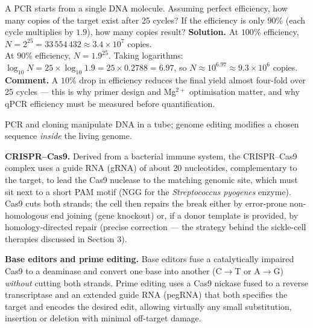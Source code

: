 \documentclass[11pt]{article}
\newcommand{\cle}[1]{{\popxbold\color{popdark}#1}}
\newcounter{popsec}
\newcounter{popsub}
\newcommand{\courssub}[1]{%
  \stepcounter{popsub}%
  \par\vspace{9pt}\noindent{\popxbold\fontsize{11.5}{13}\selectfont\color{popink}{\color{poporange}\thepopsec.\thepopsub}\hspace{6pt}#1}\par\nopagebreak\vspace{4pt}
}
\begin{document}
\begin{exoresolu}
A PCR starts from a single DNA molecule. Assuming perfect efficiency, how many copies of the target exist after 25 cycles? If the efficiency is only $90\%$ (each cycle multiplies by $1.9$), how many copies result?
\tcblower
\textbf{Solution.} At $100\%$ efficiency, $N = 2^{25} = 33\,554\,432 \approx 3.4\times 10^{7}$ copies.\\
At $90\%$ efficiency, $N = 1.9^{25}$. Taking logarithms: $\log_{10} N = 25 \times \log_{10} 1.9 = 25 \times 0.2788 = 6.97$, so $N \approx 10^{6.97} \approx 9.3 \times 10^{6}$ copies.\\
\textbf{Comment.} A $10\%$ drop in efficiency reduces the final yield almost four-fold over 25 cycles --- this is why primer design and Mg$^{2+}$ optimisation matter, and why qPCR efficiency must be measured before quantification.
\end{exoresolu}

\courssub{Modern genome-editing tools}

PCR and cloning manipulate DNA in a tube; \cle{genome editing} modifies a chosen sequence \emph{inside} the living genome.

\textbf{CRISPR--Cas9.} Derived from a bacterial immune system, the \cle{CRISPR--Cas9} complex uses a \cle{guide RNA (gRNA)} of about 20 nucleotides, complementary to the target, to lead the Cas9 nuclease to the matching genomic site, which must sit next to a short \cle{PAM} motif (NGG for the \emph{Streptococcus pyogenes} enzyme). Cas9 cuts both strands; the cell then repairs the break either by error-prone non-homologous end joining (gene knockout) or, if a donor template is provided, by homology-directed repair (precise correction --- the strategy behind the sickle-cell therapies discussed in Section 3).

\textbf{Base editors and prime editing.} \cle{Base editors} fuse a catalytically impaired Cas9 to a deaminase and convert one base into another (C$\to$T or A$\to$G) \emph{without} cutting both strands. \cle{Prime editing} uses a Cas9 nickase fused to a reverse transcriptase and an extended guide RNA (pegRNA) that both specifies the target and encodes the desired edit, allowing virtually any small substitution, insertion or deletion with minimal off-target damage.
\end{document}
